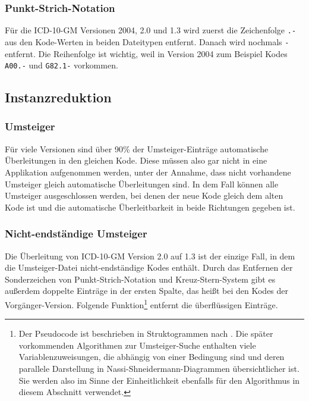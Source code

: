 \subsubsection{Punkt-Strich-Notation} Für die ICD-10-GM Versionen 2004, 2.0 und 1.3 wird zuerst die Zeichenfolge \texttt{.-} aus den Kode-Werten in beiden Dateitypen entfernt. Danach wird nochmals \texttt{-} entfernt. Die Reihenfolge ist wichtig, weil in Version 2004 zum Beispiel Kodes \texttt{A00.-} und \texttt{G82.1-} vorkommen. 

\subsection{Instanzreduktion}
 
\subsubsection{Umsteiger}

Für viele Versionen sind über 90\% der Umsteiger-Einträge automatische Überleitungen in den gleichen Kode. Diese müssen also gar nicht in eine Applikation aufgenommen werden, unter der Annahme, dass nicht vorhandene Umsteiger gleich automatische Überleitungen sind. In dem Fall können alle Umsteiger ausgeschlossen werden, bei denen der neue Kode gleich dem alten Kode ist und die automatische Überleitbarkeit in beide Richtungen gegeben ist. 

\newpage

\subsubsection{Nicht-endständige Umsteiger}

Die Überleitung von ICD-10-GM Version 2.0 auf 1.3 ist der einzige Fall, in dem die Umsteiger-Datei nicht-endständige Kodes enthält. Durch das Entfernen der Sonderzeichen von Punkt-Strich-Notation und Kreuz-Stern-System gibt es außerdem doppelte Einträge in der ersten Spalte, das heißt bei den Kodes der Vorgänger-Version. Folgende Funktion\footnote{Der Pseudocode ist beschrieben in Struktogrammen nach \citep{nassishneid}. Die später vorkommenden Algorithmen zur Umsteiger-Suche enthalten viele Variablenzuweisungen, die abhängig von einer Bedingung sind und deren parallele Darstellung in Nassi-Shneidermann-Diagrammen übersichtlicher ist. Sie werden also im Sinne der Einheitlichkeit ebenfalls für den Algorithmus in diesem Abschnitt verwendet.}
entfernt die überflüssigen Einträge.

